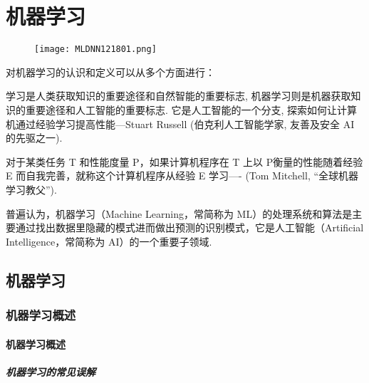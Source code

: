 \chapter{机器学习}\label{AI32PChapter7}
\begin{figure}[H]
\centering
\texttt{[image: MLDNN121801.png]}
\label{MLDNN12019121501}
\end{figure}
对机器学习的认识和定义可以从多个方面进行：
\begin{tcolorbox}[colback=white!50,colframe=orange!50,title=机器学习]
\begin{center}
学习是人类获取知识的重要途径和自然智能的重要标志, 机器学习则是机器获取知识的重要途径和人工智能的重要标志.
它是人工智能的一个分支, 探索如何让计算机通过经验学习提高性能---Stuart Russell (伯克利人工智能学家, 友善及安全 AI 的先驱之一).
\hfill
\end{center}
\end{tcolorbox}
\begin{tcolorbox}[colback=white!50,colframe=orange!50,title=机器学习]
\begin{center}
对于某类任务 T 和性能度量 P，如果计算机程序在 T 上以 P衡量的性能随着经验 E 而自我完善，就称这个计算机程序从经验 E 学习---- (Tom Mitchell, “全球机器学习教父”).
\hfill
\end{center}
\end{tcolorbox}
普遍认为，机器学习（Machine Learning，常简称为 ML）的处理系统和算法是主要通过找出数据里隐藏的模式进而做出预测的识别模式，它是人工智能（Artificial Intelligence，常简称为 AI）的一个重要子领域.
\section{机器学习}
\subsection{机器学习概述}
\subsubsection{机器学习概述}
\paragraph{机器学习的常见误解}

